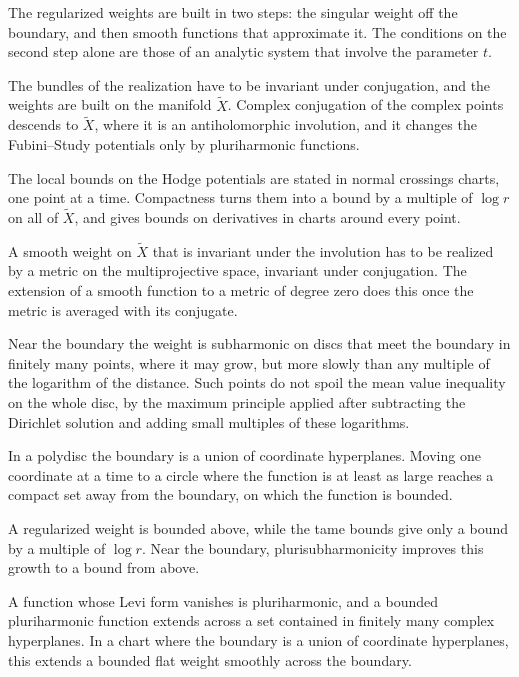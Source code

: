 The regularized weights are built in two steps: the singular weight off the boundary, and then smooth functions that
approximate it. The conditions on the second step alone are those of an analytic system that involve the parameter $t$.

The bundles of the realization have to be invariant under conjugation, and the weights are built on the manifold
$\tilde X$. Complex conjugation of the complex points descends to $\tilde X$, where it is an antiholomorphic involution,
and it changes the Fubini--Study potentials only by pluriharmonic functions.

The local bounds on the Hodge potentials are stated in normal crossings charts, one point at a time. Compactness turns
them into a bound by a multiple of $\log r$ on all of $\tilde X$, and gives bounds on derivatives in charts around every
point.

A smooth weight on $\tilde X$ that is invariant under the involution has to be realized by a metric on the multiprojective
space, invariant under conjugation. The extension of a smooth function to a metric of degree zero does this once the
metric is averaged with its conjugate.

Near the boundary the weight is subharmonic on discs that meet the boundary in finitely many points, where it may grow,
but more slowly than any multiple of the logarithm of the distance. Such points do not spoil the mean value inequality
on the whole disc, by the maximum principle applied after subtracting the Dirichlet solution and adding small multiples
of these logarithms.

In a polydisc the boundary is a union of coordinate hyperplanes. Moving one coordinate at a time to a circle where the
function is at least as large reaches a compact set away from the boundary, on which the function is bounded.

A regularized weight is bounded above, while the tame bounds give only a bound by a multiple of $\log r$. Near the
boundary, plurisubharmonicity improves this growth to a bound from above.

A function whose Levi form vanishes is pluriharmonic, and a bounded pluriharmonic function extends across a set
contained in finitely many complex hyperplanes. In a chart where the boundary is a union of coordinate hyperplanes, this
extends a bounded flat weight smoothly across the boundary.

